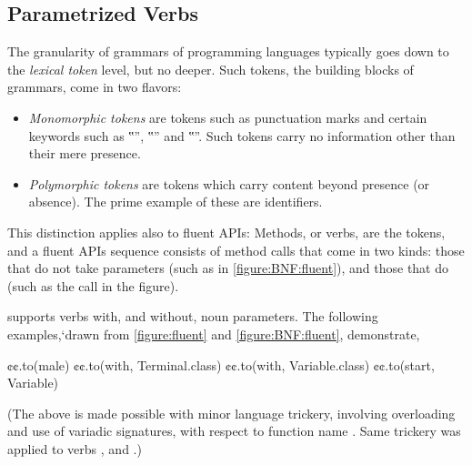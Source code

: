 \subsection{Parametrized Verbs}
The granularity of grammars of programming languages typically goes down to the \emph{lexical token} level,
  but no deeper.
Such tokens, the building blocks of grammars, come in two flavors:
\begin{itemize}
  \item \emph{Monomorphic tokens} are tokens such as punctuation marks and
    certain keywords such as ‟”, ‟” and ‟”.
    Such tokens carry no information other than their mere presence.
  \item \emph{Polymorphic tokens} are tokens which carry content beyond
    presence (or absence). The prime example of these are identifiers.
\end{itemize}

This distinction applies also to fluent APIs:
Methods, or verbs, are the tokens, and a fluent APIs sequence consists of
method calls that come in two kinds: those that do not take parameters (such as  in \cref{figure:BNF:fluent}),
and those that do (such as the call  in the figure).

\Self supports verbs with, and without, noun parameters.
The following examples,`drawn from \cref{figure:fluent} and \cref{figure:BNF:fluent},
  demonstrate,
\begin{JAVA}
  ¢¢.to(male)
  ¢¢.to(with, Terminal.class)
  ¢¢.to(with, Variable.class)
  ¢¢.to(start, Variable)\end{JAVA}
(The above is made possible with minor \Java language trickery,
  involving overloading and use of variadic signatures,
  with respect to function name .
Same trickery was applied to verbs , and .)

